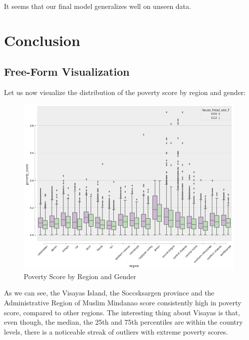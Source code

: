 \documentclass{article}
\begin{document}
It seems that our final model generalizes well on unseen data.

\section{Conclusion}
\subsection{Free-Form Visualization}

Let us now visualize the distribution of the poverty score by region and gender:

\begin{figure}[H]
\caption{Poverty Score by Region and Gender}
\centering
\includegraphics[width = 0.7 \textwidth]{poverty_score_region_gender}
\end{figure}

As we can see, the Visayas Island, the Soccsksargen province and the Administrative Region of Muslim Mindanao score consistently high in poverty score, compared to other regions. The interesting thing about Visayas is that, even though, the median, the 25th and 75th percentiles are within the country levels, there is a noticeable streak of outliers with extreme poverty scores.
\end{document}

